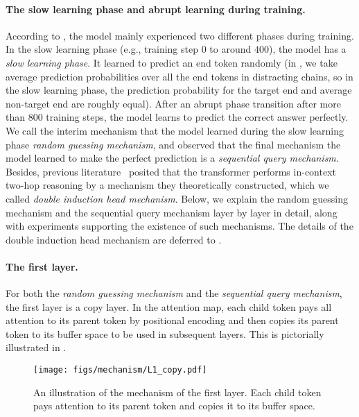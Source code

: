 \paragraph{The slow learning phase and abrupt learning during training.} According to , the model mainly experienced two different phases during training. In the slow learning phase (e.g., training step $0$ to around $400$), the model has a \textit{slow learning phase}. It learned to predict an end token randomly (in , we take average prediction probabilities over all the end tokens in distracting chains, so in the slow learning phase, the prediction probability for the target end and average non-target end are roughly equal). After an abrupt phase transition after more than $800$ training steps, the model learns to predict the correct answer perfectly. We call the interim mechanism that the model learned during the slow learning phase \emph{random guessing mechanism}, and observed that the final mechanism the model learned to make the perfect prediction is a \emph{sequential query mechanism}. Besides, previous literature~\citep{sanford2024transformers} posited that the transformer performs in-context two-hop reasoning by a mechanism they theoretically constructed, which we called \emph{double induction head mechanism}. Below, we explain the random guessing mechanism and the sequential query mechanism layer by layer in detail, along with experiments supporting the existence of such mechanisms. The details of the double induction head mechanism are deferred to .

\paragraph{The first layer.} For both the \emph{random guessing mechanism} and the \emph{sequential query mechanism}, the first layer is a copy layer. In the attention map, each child token pays all attention to its parent token by positional encoding and then copies its parent token to its buffer space to be used in subsequent layers. This is pictorially illustrated in .

\begin{figure}[h]
    \centering
    \texttt{[image: figs/mechanism/L1\_copy.pdf]}
    \caption{An illustration of the mechanism of the first layer. Each child token pays attention to its parent token and copies it to its buffer space.}
    \label{fig:mech:L1_copy}
\end{figure}

